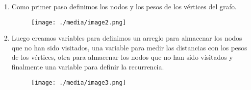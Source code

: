 \documentclass[12pt]{article}
\renewcommand{\_}{\kern-1.5pt\textunderscore\kern-1.5pt}
\begin{document}
\begin{enumerate}
	\item Como primer paso definimos los nodos y los pesos de los vértices del grafo.\par




\begin{figure}[H]
	\begin{Center}
		\texttt{[image: ./media/image2.png]}
	\end{Center}
\end{figure}



\par

	\item Luego creamos variables para definimos un arreglo para almacenar los nodos que no han sido visitados, una variable para medir las distancias con los pesos de los vértices, otra para almacenar los nodos que no han sido visitados y finalmente una variable para definir la recurrencia.\par




\begin{figure}[H]
	\begin{Center}
		\texttt{[image: ./media/image3.png]}
	\end{Center}
\end{figure}



\par


\vspace{\baselineskip}

\vspace{\baselineskip}

\vspace{\baselineskip}

\vspace{\baselineskip}

\vspace{\baselineskip}

\vspace{\baselineskip}


\end{enumerate}
\end{document}
